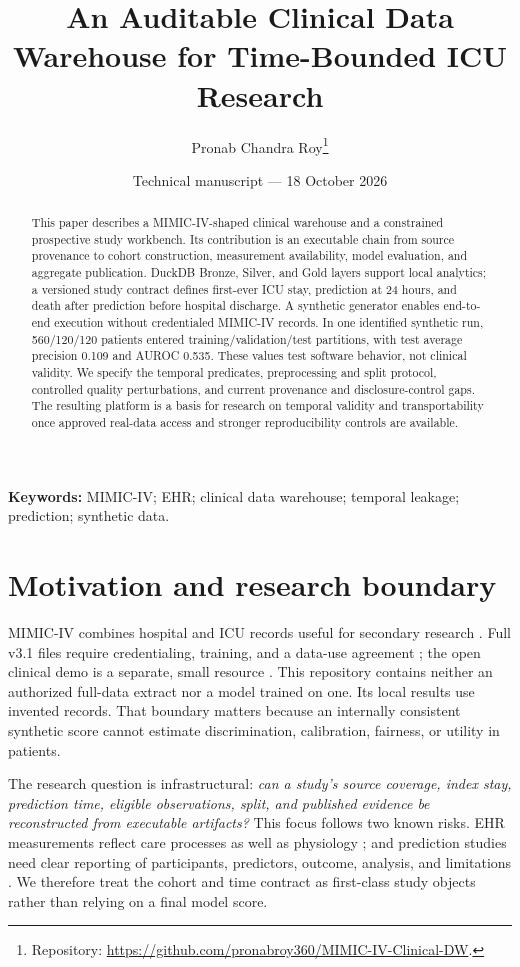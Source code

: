 \documentclass[11pt,a4paper]{article}
\title{An Auditable Clinical Data Warehouse for Time-Bounded ICU Research}
\author{Pronab Chandra Roy\thanks{Repository: \url{https://github.com/pronabroy360/MIMIC-IV-Clinical-DW}.}}
\date{Technical manuscript --- 18 October 2026}
\begin{document}
\maketitle

\begin{abstract}
This paper describes a MIMIC-IV-shaped clinical warehouse and a constrained prospective study workbench. Its contribution is an executable chain from source provenance to cohort construction, measurement availability, model evaluation, and aggregate publication. DuckDB Bronze, Silver, and Gold layers support local analytics; a versioned study contract defines first-ever ICU stay, prediction at 24 hours, and death after prediction before hospital discharge. A synthetic generator enables end-to-end execution without credentialed MIMIC-IV records. In one identified synthetic run, 560/120/120 patients entered training/validation/test partitions, with test average precision 0.109 and AUROC 0.535. These values test software behavior, not clinical validity. We specify the temporal predicates, preprocessing and split protocol, controlled quality perturbations, and current provenance and disclosure-control gaps. The resulting platform is a basis for research on temporal validity and transportability once approved real-data access and stronger reproducibility controls are available.
\end{abstract}

\noindent\textbf{Keywords:} MIMIC-IV; EHR; clinical data warehouse; temporal leakage; prediction; synthetic data.

\section{Motivation and research boundary}

MIMIC-IV combines hospital and ICU records useful for secondary research \cite{mimicpaper}. Full v3.1 files require credentialing, training, and a data-use agreement \cite{mimicv31}; the open clinical demo is a separate, small resource \cite{mimicdemo}. This repository contains neither an authorized full-data extract nor a model trained on one. Its local results use invented records. That boundary matters because an internally consistent synthetic score cannot estimate discrimination, calibration, fairness, or utility in patients.

The research question is infrastructural: \emph{can a study's source coverage, index stay, prediction time, eligible observations, split, and published evidence be reconstructed from executable artifacts?} This focus follows two known risks. EHR measurements reflect care processes as well as physiology \cite{agniel2018}; and prediction studies need clear reporting of participants, predictors, outcome, analysis, and limitations \cite{tripodai,probast}. We therefore treat the cohort and time contract as first-class study objects rather than relying on a final model score.
\end{document}
